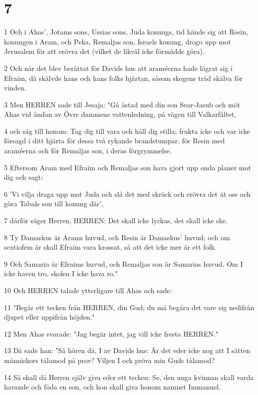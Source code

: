 \chapter{7}

\par 1 Och i Ahas', Jotams sons, Ussias sons, Juda konungs, tid hände sig att Resin, konungen i Aram, och Peka, Remaljas son, Israels konung, drogo upp mot Jerusalem för att erövra det (vilket de likväl icke förmådde göra).
\par 2 Och när det blev berättat för Davids hus att araméerna hade lägrat sig i Efraim, då skälvde hans och hans folks hjärtan, såsom skogens träd skälva för vinden.
\par 3 Men HERREN sade till Jesaja: "Gå åstad med din son Sear-Jasub och möt Ahas vid ändan av Övre dammens vattenledning, på vägen till Valkarfältet,
\par 4 och säg till honom: Tag dig till vara och håll dig stilla; frukta icke och var icke försagd i ditt hjärta för dessa två rykande brandstumpar, för Resin med araméerna och för Remaljas son, i deras förgrymmelse.
\par 5 Eftersom Aram med Efraim och Remaljas son hava gjort upp onda planer mot dig och sagt:
\par 6 'Vi vilja draga upp mot Juda och slå det med skräck och erövra det åt oss och göra Tabals son till konung där',
\par 7 därför säger Herren, HERREN: Det skall icke lyckas, det skall icke ske.
\par 8 Ty Damaskus är Arams huvud, och Resin är Damaskus' huvud; och om sextiofem år skall Efraim vara krossat, så att det icke mer är ett folk.
\par 9 Och Samaria är Efraims huvud, och Remaljas son är Samarias huvud. Om I icke haven tro, skolen I icke hava ro."
\par 10 Och HERREN talade ytterligare till Ahas och sade:
\par 11 "Begär ett tecken från HERREN, din Gud; du må begära det vare sig nedifrån djupet eller uppifrån höjden."
\par 12 Men Ahas svarade: "Jag begär intet, jag vill icke fresta HERREN."
\par 13 Då sade han: "Så hören då, I av Davids hus: Är det eder icke nog att I sätten människors tålamod på prov? Viljen I ock pröva min Guds tålamod?
\par 14 Så skall då Herren själv giva eder ett tecken: Se, den unga kvinnan skall varda havande och föda en son, och hon skall giva honom namnet Immanuel.
